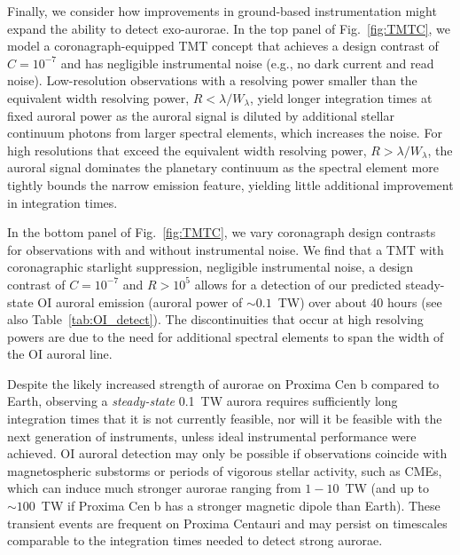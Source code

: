 \documentclass{emulateapj}
\begin{document}
Finally, we consider how improvements in ground-based instrumentation might expand the ability to detect exo-aurorae. In the top panel of Fig.~\ref{fig:TMTC}, we model a coronagraph-equipped TMT concept that achieves a design contrast of $C = 10^{-7}$ and has negligible instrumental noise (e.g., no dark current and read noise).  Low-resolution observations with a resolving power smaller than the equivalent width resolving power, $R < \lambda/W_\lambda$, yield longer integration times at fixed auroral power as the auroral signal is diluted by additional stellar continuum photons from larger spectral elements, which increases the noise.  For high resolutions that exceed the equivalent width resolving power, $R > \lambda/W_\lambda$, the auroral signal dominates the planetary continuum as the spectral element more tightly bounds the narrow emission feature, yielding little additional improvement in integration times.

In the bottom panel of Fig.~\ref{fig:TMTC}, we vary coronagraph design contrasts for observations with and without instrumental noise.  We find that a TMT with coronagraphic starlight suppression, negligible instrumental noise, a design contrast of $C = 10^{-7}$ and $R > 10^5$ allows for a detection of our predicted steady-state OI auroral emission (auroral power of ${\sim}0.1$~TW) over about 40 hours (see also Table~\ref{tab:OI_detect}). The discontinuities that occur at high resolving powers are due to the need for additional spectral elements to span the width of the OI auroral line.

Despite the likely increased strength of aurorae on Proxima Cen b compared to Earth, observing a {\em steady-state} 0.1~TW aurora requires sufficiently long integration times that it is not currently feasible, nor will it be feasible with the next generation of instruments, unless ideal instrumental performance were achieved. OI auroral detection may only be possible if observations coincide with magnetospheric substorms or periods of vigorous stellar activity, such as CMEs, which can induce much stronger aurorae ranging from $1 - 10$~TW (and up to ${\sim} 100$~TW if Proxima Cen b has a stronger magnetic dipole than Earth). These transient events are frequent on Proxima Centauri \citep{Davenport2016} and may persist on timescales comparable to the integration times needed to detect strong aurorae.
\end{document}
